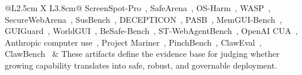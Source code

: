 \begin{table}[!ht]
\begin{tabularx}{\textwidth}{@{}L{2.5cm} X L{3.8cm}@{}}
ScreenSpot-Pro~\cite{screenspotpro2025},
\colorbox{evSaf!15}{SafeArena~\cite{safearena2025}},
\colorbox{evSaf!15}{OS-Harm~\cite{osharm2025}},
\colorbox{evSaf!15}{WASP~\cite{wasp2025}},
\colorbox{evSaf!15}{SecureWebArena~\cite{securewebarena2025}},
\colorbox{evSaf!15}{SusBench~\cite{susbench2025}},
\colorbox{evSaf!15}{DECEPTICON~\cite{decepticon2025}},
\colorbox{evSaf!15}{PASB~\cite{doubleagent2026}},
\colorbox{evSaf!15}{MemGUI-Bench~\cite{memguibench2026}},
\colorbox{evSaf!15}{GUIGuard~\cite{guiguard2026}},
\colorbox{evSaf!15}{WorldGUI~\cite{worldgui2025}},
\colorbox{evSaf!15}{BeSafe-Bench~\cite{besafebench2026}},
\colorbox{evSaf!15}{ST-WebAgentBench~\cite{stwebagentbench2025}},
OpenAI CUA~\cite{openai2025cua},
Anthropic computer use~\cite{anthropic2025computeruse},
Project Mariner~\cite{google2026mariner},
PinchBench~\cite{pinchbench2026},
ClawEval~\cite{claweval2026},
ClawBench~\cite{clawbench2026} &
These artifacts define the evidence base for judging whether growing capability translates into safe, robust, and governable deployment. \\
\bottomrule
\end{tabularx}
\end{table}



